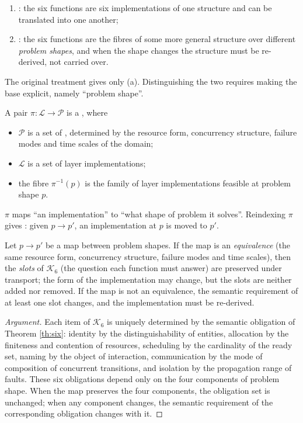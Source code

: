 \begin{enumerate}[label=(\alph*)]
\item {}: the six functions are six implementations of one structure and can
      be translated into one another;
\item {}: the six functions are the fibres of some more general
      structure over different \emph{problem shapes}, and when the shape changes the
      structure must be re-derived, not carried over.
\end{enumerate}

The original treatment gives only (a). Distinguishing the two requires making the base
explicit, namely ``problem shape''.

\begin{definition}\label{def:fibration}
A pair $\pi : \mathcal{L} \to \mathcal{P}$ is a , where
\begin{itemize}
\item $\mathcal{P}$ is a set of , determined by the resource form,
      concurrency structure, failure modes and time scales of the domain;
\item $\mathcal{L}$ is a set of layer implementations;
\item the fibre $\pi^{-1}(p)$ is the family of layer implementations feasible at problem
      shape $p$.
\end{itemize}
$\pi$ maps ``an implementation'' to ``what shape of problem it solves''. Reindexing $\pi$
gives : given $p \to p'$, an implementation at $p$ is moved
to $p'$.
\end{definition}

\begin{proposition}\label{prop:transport}
Let $p \to p'$ be a map between problem shapes. If the map is an \emph{equivalence} (the same
resource form, concurrency structure, failure modes and time scales), then the \emph{slots}
of $\mathcal{K}_6$ (the question each function must answer) are preserved under transport;
the form of the implementation may change, but the slots are neither added nor removed. If
the map is not an equivalence, the semantic requirement of at least one slot changes, and
the implementation must be re-derived.
\end{proposition}

\begin{proof}[Argument]
Each item of $\mathcal{K}_6$ is uniquely determined by the semantic obligation of
Theorem \ref{th:six}: identity by the distinguishability of entities, allocation by the
finiteness and contention of resources, scheduling by the cardinality of the ready set,
naming by the object of interaction, communication by the mode of composition of concurrent
transitions, and isolation by the propagation range of faults. These six obligations depend
only on the four components of problem shape. When the map preserves the four components,
the obligation set is unchanged; when any component changes, the semantic requirement of the
corresponding obligation changes with it.
\end{proof}

